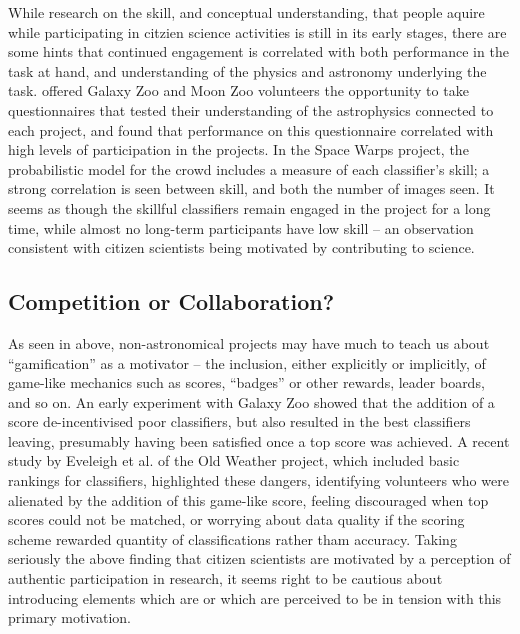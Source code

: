 \documentclass{ar2e}
\begin{document}
While research on the skill, and conceptual understanding, that  people aquire
while participating in citzien science activities is still in its early
stages, there are some hints that continued engagement is correlated with both
performance in the task at hand, and understanding of the physics and
astronomy underlying the task. \citet{Prather++2013} offered Galaxy Zoo and
Moon Zoo volunteers the opportunity to take questionnaires that tested their
understanding of the astrophysics connected to each project, and found that
performance on this questionnaire correlated with high levels of participation
in the projects. In the Space Warps project, the probabilistic model for the
crowd includes a measure of each classifier's skill; a strong correlation is
seen between skill, and both the number of images seen. It seems as though the
skillful classifiers remain engaged in the project for a long time, while
almost no long-term participants have low skill -- an observation consistent
with citizen scientists being motivated by contributing to science.



\subsection{Competition or Collaboration?}
\label{sec:crowd:gamification}

As seen in  above, non-astronomical projects may have
much to teach us about ``gamification'' as a motivator -- the inclusion, either
explicitly or implicitly, of game-like mechanics such as scores, ``badges'' or
other rewards, leader boards, and so on. An early experiment with Galaxy Zoo
showed that the addition of a score de-incentivised poor classifiers, but also
resulted in the best classifiers leaving, presumably having been satisfied once
a top score was achieved. A recent study by Eveleigh et al. of the Old Weather
project, which included basic rankings for classifiers, highlighted these
dangers, identifying volunteers who were alienated by the addition of this
game-like score, feeling discouraged when top scores could not be matched, or
worrying about data quality if the scoring scheme rewarded quantity of
classifications rather tham accuracy. Taking seriously the above finding 
that citizen scientists are motivated by a perception of authentic
participation in research, it seems right to be cautious about introducing
elements which are or which are perceived to be in tension with this primary
motivation. 
\end{document}
